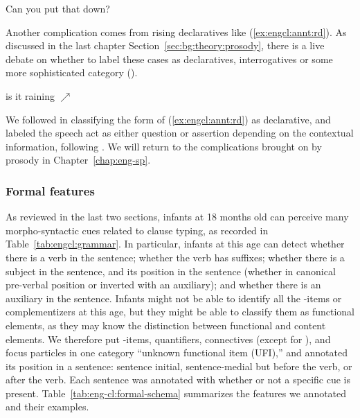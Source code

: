 Can you put that down?
\eex 

Another complication comes from rising declaratives like (\ref{ex:engcl:annt:rd}). As discussed in the last chapter Section~\ref{sec:bg:theory:prosody}, there is a live debate on whether to label these cases as declaratives, interrogatives or some more sophisticated category (\cite{gunlogson2008,  farkasroelofsen2017}). 

is it raining $\nearrow$
\eex

We followed \textcite{gunlogson2008} in classifying the form of (\ref{ex:engcl:annt:rd}) as declarative, and labeled the speech act as either question or assertion depending on the contextual information, following \textcite{jeong2018, goodhue2021rd}. We will return to the complications brought on by prosody in Chapter~\ref{chap:eng-sp}.

\subsubsection{Formal features}

As reviewed in the last two sections, infants at 18 months old can perceive many morpho-syntactic cues related to clause typing, as recorded in Table~\ref{tab:engcl:grammar}. In particular, infants at this age can detect whether there is a verb in the sentence; whether the verb has suffixes; whether there is a subject in the sentence, and its position in the sentence (whether in canonical pre-verbal position or inverted with an auxiliary); and whether there is an auxiliary in the sentence. Infants might not be able to identify all the \twh-items or complementizers at this age, but they might be able to classify them as functional elements, as they may know the distinction between functional and content elements. We therefore put \twh-items, quantifiers, connectives (except for ), and focus particles in one category ``unknown functional item (UFI),'' and annotated its position in a sentence: sentence initial, sentence-medial but before the verb, or after the verb. Each sentence was annotated with whether or not a specific cue is present. Table~\ref{tab:eng-cl:formal-schema} summarizes the features we annotated and their examples.  


